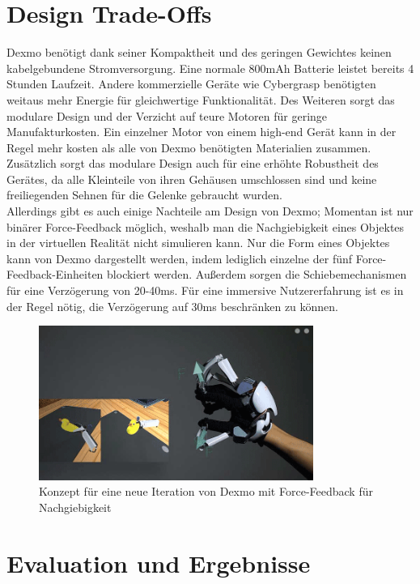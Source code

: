 \chapter{Design Trade-Offs}\label{Design Trade-Offs}
Dexmo benötigt dank seiner Kompaktheit und des geringen Gewichtes keinen kabelgebundene Stromversorgung. Eine normale 800mAh Batterie leistet bereits 4 Stunden Laufzeit. Andere kommerzielle Geräte wie Cybergrasp benötigten weitaus mehr Energie für gleichwertige Funktionalität. Des Weiteren sorgt das modulare Design und der Verzicht auf teure Motoren für geringe Manufakturkosten. Ein einzelner Motor von einem high-end Gerät kann in der Regel mehr kosten als alle von Dexmo benötigten Materialien zusammen. Zusätzlich sorgt das modulare Design auch für eine erhöhte Robustheit des Gerätes, da alle Kleinteile von ihren Gehäusen umschlossen sind und keine freiliegenden Sehnen für die Gelenke gebraucht wurden.\\
Allerdings gibt es auch einige Nachteile am Design von Dexmo; Momentan ist nur binärer Force-Feedback möglich, weshalb man die Nachgiebigkeit eines Objektes in der virtuellen Realität nicht simulieren kann. Nur die Form eines Objektes kann von Dexmo dargestellt werden, indem lediglich einzelne der fünf Force-Feedback-Einheiten blockiert werden. Außerdem sorgen die Schiebemechanismen für eine Verzögerung von 20-40ms. Für eine immersive Nutzererfahrung ist es in der Regel nötig, die Verzögerung auf 30ms beschränken zu können.

\begin{figure}[!ht] %
\centering
\includegraphics[width=0.8\textwidth]{images/concept.png}
\caption{Konzept für eine neue Iteration von Dexmo mit Force-Feedback für Nachgiebigkeit}
\end{figure}

\chapter{Evaluation und Ergebnisse}\label{Evaluation und Ergebnisse}

